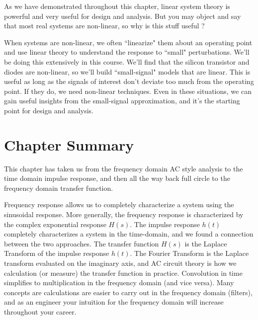 As we have demonstrated throughout this chapter, linear system theory is powerful and very useful for design and analysis.  But you may object and say that most real systems are non-linear, so why is this stuff useful ?

When systems are non-linear, we often ``linearize" them about an operating point and use linear theory to understand the response to ``small" perturbations.  We'll be doing this extensively in this course. We'll find that the silicon transistor and diodes are non-linear, so we'll build ``small-signal" models that are linear.  This is useful as long as the signals of interest don't deviate too much from the operating point.  If they do, we need non-linear techniques.  Even in these situations,  we can gain useful insights from the small-signal approximation, and it's the starting point for design and analysis.
 


\section{Chapter Summary}

This chapter has taken us from the frequency domain AC style analysis to the time domain impulse response, and then all the way back full circle to the frequency domain transfer function.

 Frequency response allows us to completely characterize a system using the sinusoidal response.
 More generally, the frequency response is characterized by the complex exponential response $H(s)$.   The impulse response $h(t)$ completely characterizes a system in the time-domain, and we found a connection between the two approaches.   The transfer function $H(s)$ is the Laplace Transform of the impulse response $h(t)$.  The Fourier Transform is the Laplace transform evaluated on the imaginary axis, and AC circuit theory is how we calculation (or measure) the transfer function in practice.   Convolution in time simplifies to multiplication in the frequency domain (and vice versa).
 Many concepts are calculations are easier to carry out in the frequency domain (filters), and as an engineer your intuition for the frequency domain will increase throughout your career.

 
















